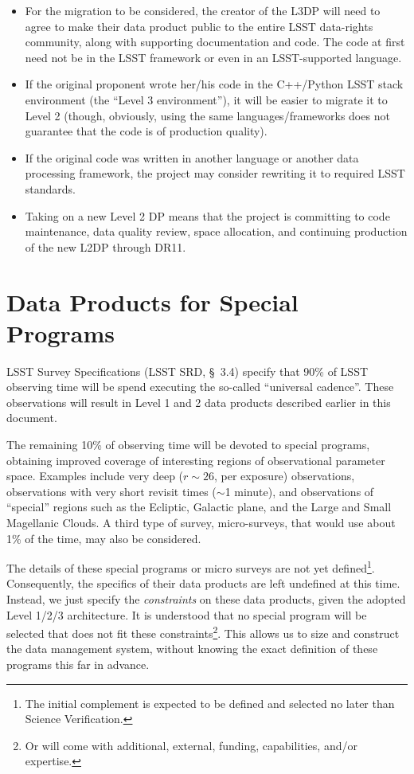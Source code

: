 \documentclass[12pt]{article}
\newcommand{\req}[1]{\marginpar{\tiny #1}}
\begin{document}
\begin{itemize}
\item For the migration to be considered, the creator of the L3DP will need to agree to make their data product public to the entire LSST data-rights community, along with supporting documentation and code. The code at first need not be in the LSST framework or even in an LSST-supported language.
\item If the original proponent wrote her/his code in the C++/Python LSST stack environment (the ``Level 3 environment''), it will be easier to migrate it to Level 2 (though, obviously, using the same languages/frameworks does not guarantee that the code is of production quality).
\item If the original code was written in another language or another data processing framework, the project may consider rewriting it to required LSST standards.
\item Taking on a new Level 2 DP means that the project is committing to code maintenance, data quality review, space allocation, and continuing production of the new L2DP through DR11.
\end{itemize}

\clearpage

\section{Data Products for Special Programs}
\label{sec:specialProgs}

\req{LSR-REQ-0075}
LSST Survey Specifications (LSST SRD, \S~3.4) specify that 90\% of LSST observing time will be spend executing the so-called ``universal cadence''. These observations will result in Level 1 and 2 data products described earlier in this document.

The remaining 10\% of observing time will be devoted to special programs, obtaining improved coverage of interesting regions of observational parameter space. Examples include very deep ($r \sim 26$, per exposure) observations, observations with very short revisit times ($\sim$1 minute), and observations of ``special'' regions such as the Ecliptic, Galactic plane, and the Large and Small Magellanic Clouds. A third type of survey, micro-surveys, that would use about 1\% of the time, may also be considered.

The details of these special programs or micro surveys are not yet defined\footnote{The initial complement is expected to be defined and selected no later than Science Verification.}. Consequently, the specifics of their data products are left undefined at this time. Instead, we just specify the \emph{constraints} on these data products, given the adopted Level 1/2/3 architecture. It is understood that no special program will be selected that does not fit these constraints\footnote{Or will come with additional, external, funding, capabilities, and/or expertise.}. This allows us to size and construct the data management system, without knowing the exact definition of these programs this far in advance.
\\
\end{document}
